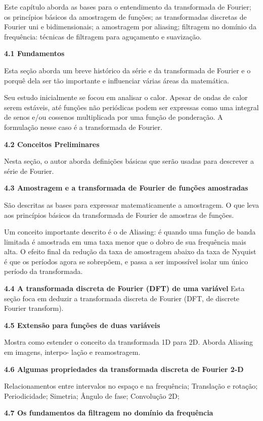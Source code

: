 \documentclass[a4paper]{sbgames}               %
\begin{document}
Este capítulo aborda as bases para o entendimento da transformada de Fourier; os princípios básicos da amostragem de funções; as transformadas discretas de Fourier uni e bidimensionais; a amostragem por aliasing; filtragem no domínio da
frequência: técnicas de filtragem para aguçamento e suavização.

\textbf{4.1 Fundamentos}

Esta seção aborda um breve histórico da série e da transformada de Fourier e o porquê dela ser tão importante e influenciar várias áreas da matemática. 

Seu estudo inicialmente se focou em analisar o calor. Apesar de ondas de calor serem estáveis, até funções não periódicas podem ser expressas como uma integral de senos e/ou cossenos multiplicada por uma função de ponderação. A formulação nesse caso é a transformada de Fourier.

\textbf{4.2 Conceitos Preliminares}

Nesta seção, o autor aborda definições básicas que serão usadas para descrever a série de Fourier.

\textbf{4.3 Amostragem e a transformada de Fourier de funções amostradas}

São descritas as bases para expressar matematicamente a amostragem. O que leva aos princípios básicos da transformada de Fourier de amostras de funções. 

Um conceito importante descrito é o de Aliasing: é quando uma função de banda limitada é amostrada em uma taxa menor que o dobro de sua frequência mais alta. O efeito final da redução da taxa de amostragem abaixo da taxa de Nyquist é que os períodos agora se sobrepõem, e passa a ser impossível isolar um único período da transformada.

\textbf{4.4 A transformada discreta de Fourier (DFT) de uma variável}
Esta seção foca em deduzir a transformada discreta de Fourier (DFT, de discrete Fourier transform).

\textbf{4.5 Extensão para funções de duas variáveis}

Mostra como estender o conceito da transformada 1D para 2D. Aborda Aliasing em imagens, interpo- lação e reamostragem.

\textbf{4.6 Algumas propriedades da transformada discreta de Fourier 2-D}

Relacionamentos entre intervalos no espaço e na frequência; Translação e rotação; Periodicidade; Simetria; Ângulo de fase; Convolução 2D;

\textbf{4.7 Os fundamentos da filtragem no domínio da frequência}
\end{document}
